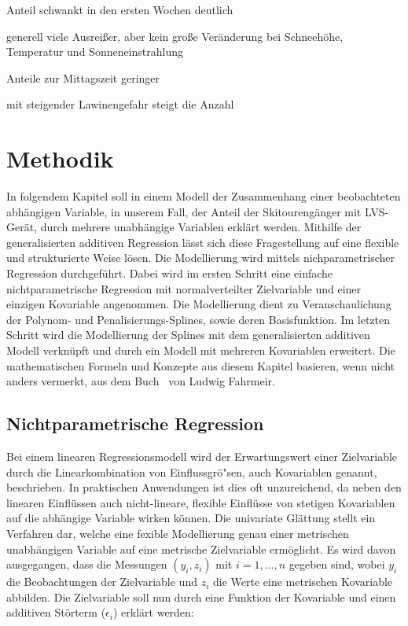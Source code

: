 \documentclass[12pt]{scrreprt}
\begin{document}
Anteil schwankt in den ersten Wochen deutlich



generell viele Ausreißer, aber kein große Veränderung bei Schneehöhe, Temperatur und Sonneneinstrahlung



Anteile zur Mittagszeit geringer



mit steigender Lawinengefahr steigt die Anzahl



\chapter{Methodik}
In folgendem Kapitel soll in einem Modell der Zusammenhang einer beobachteten abhängigen Variable, in unserem Fall, der Anteil der Skitourengänger mit LVS-Gerät, durch mehrere unabhängige Variablen erklärt werden.
Mithilfe der generalisierten additiven Regression lässt sich diese Fragestellung auf eine flexible und strukturierte Weise lösen. Die Modellierung wird mittels nichparametrischer Regression durchgeführt.
Dabei wird im ersten Schritt eine einfache nichtparametrische Regression mit normalverteilter Zielvariable und einer einzigen Kovariable angenommen. Die Modellierung dient zu Veranschaulichung der Polynom- und Penalisierungs-Splines, sowie deren Basisfunktion. Im letzten Schritt wird die Modellierung der Splines mit dem generalisierten additiven Modell verknüpft und durch ein Modell mit mehreren Kovariablen erweitert. Die mathematischen Formeln und Konzepte aus diesem Kapitel basieren, wenn nicht anders vermerkt, aus dem Buch \grqq ~von Ludwig Fahrmeir. 

\section{Nichtparametrische Regression}
Bei einem linearen Regressionsmodell wird der Erwartungswert einer Zielvariable durch die Linearkombination von Einflussgrö"sen, auch Kovariablen genannt, beschrieben. In praktischen Anwendungen ist dies oft unzureichend, da neben den linearen Einflüssen auch nicht-lineare, flexible Einflüsse von stetigen Kovariablen auf die abhängige Variable wirken können.
Die univariate Glättung stellt ein Verfahren dar, welche eine fexible Modellierung genau einer metrischen unabhängigen Variable auf eine metrische Zielvariable ermöglicht. Es wird davon ausgegangen, dass die Messungen $(y_{i},z_{i})$ mit $i=1,...,n$ gegeben sind, wobei $y_{i}$ die Beobachtungen der Zielvariable und $z_{i}$ die Werte eine metrischen Kovariable abbilden. Die Zielvariable soll nun durch eine Funktion der Kovariable und einen additiven Störterm ($\epsilon_{i}$) erklärt werden:
\end{document}

